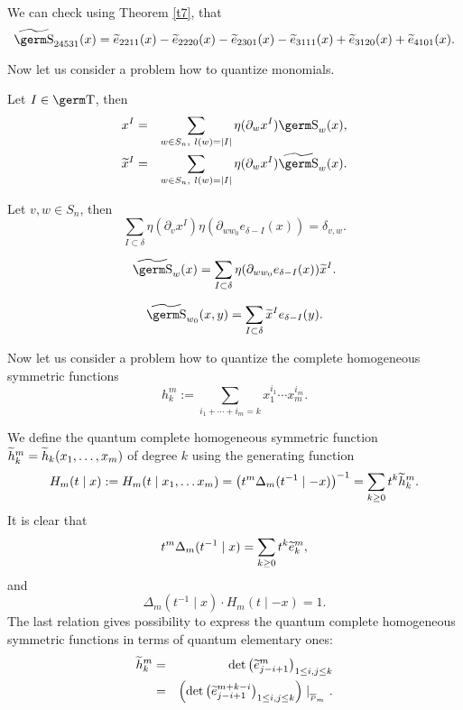 {{We can check using Theorem \ref{t7}, that
$$\wt{\s}_{24531}(x)=\wt e_{2211}(x)-\wt e_{2220}(x)-\wt e_{2301}(x)-
\wt e_{3111}(x)+\wt e_{3120}(x)+\wt e_{4101}(x).
$$

Now let us consider a problem how to quantize monomials.

\begin{pr} Let $I\in\t$, then
\begin{eqnarray*} x^I&=&\sum_{w\in S_n, \  l(w)=|I|}\eta 
(\partial_wx^I)\s_w(x),\\ \wt x^I&=&\sum_{w\in S_n, \ l(w)=|I|}\eta 
(\partial_wx^I)\wt{\s}_w(x).
\end{eqnarray*}
\end{pr}
\begin{col} Let $v,w\in S_n$, then
$$\sum_{I\subset\delta}\eta (\partial_vx^I)\eta (\partial_{ww_0}e_{\delta 
-I}(x))=\delta_{v,w}.
$$
\end{col}
\begin{col}
$$\wt{\s}_w(x)=\sum_{I\subset\delta}\eta (\partial_{ww_0}e_{\delta 
-I}(x))\wt x^I.
$$
\end{col}
\begin{col}
$$\wt{\s}_{w_0}(x,y)=\sum_{I\subset\delta}\wt x^Ie_{\delta -I}(y).
$$
\end{col}

Now let us consider a problem how to quantize the complete homogeneous 
symmetric functions 
\[ h_k^m := \sum_{i_1+\cdots+ i_m =k}x_1^{i_1}\cdots x_m^{i_m} . \] 

We define the quantum complete homogeneous symmetric function 
$\widetilde{h}_k^m = \widetilde{h}_k(x_1,\ldots ,x_m)$  of degree $k$ using the 
generating function 
$$H_m(t\mid x) := H_m(t\mid x_1,\ldots x_m) = \left( t^m \Delta_m(t^{-1}
\mid -x) \right) ^{-1}=\sum_{k\geq 0}t^k \widetilde{h}_k^m. 
$$
It is clear that 
\[ t^m \Delta_m(t^{-1}\mid x) = \sum_{k\geq 0} t^k \widetilde{e}_k^m , \] 
and 
\[ \Delta_m(t^{-1}\mid x)\cdot H_m(t\mid -x) =1. \] 
The last relation gives possibility to express the quantum complete 
homogeneous symmetric functions in terms of quantum elementary ones: 
\begin{eqnarray}
\widetilde{h}_k^m & = & {\rm det} 
\left( \widetilde{e}_{j-i+1}^m \right)_{1\leq i,j\leq k} \nonumber \\ 
 & = & \left({\rm det} 
\left( \widetilde{e}_{j-i+1}^{m+k-i} \right)_{1\leq i,j\leq k}
\right)\mid_{_{\overline P_m}}.
\end{eqnarray} 

}}
